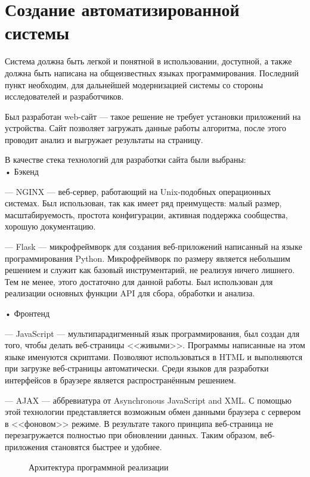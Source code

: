 \pagebreak
\section{Создание автоматизированной системы}

Система должна быть легкой и понятной в использовании, доступной, а также должна быть написана на общеизвестных языках программирования. Последний пункт необходим, для дальнейшей модернизацией системы со стороны исследователей и разработчиков.

Был разработан web-сайт --- такое решение не требует установки приложений на устройства. Сайт позволяет загружать данные работы алгоритма, после этого проводит анализ и выгружает результаты на страницу.

В качестве стека технологий для разработки сайта были выбраны:\\
• Бэкенд
\par
--- NGINX --- веб-сервер, работающий на Unix-подобных операционных системах. Был использован, так как имеет ряд преимуществ: малый размер, масштабируемость, простота конфигурации, активная поддержка сообщества, хорошую документацию.
\par
--- Flask --- микрофреймворк для создания веб-приложений написанный на языке программирования Python. Микрофреймворк по размеру является небольшим решением и служит как базовый инструментарий, не реализуя ничего лишнего. Тем не менее, этого достаточно для данной работы. Был использован для реализации основных функции API для сбора, обработки и анализа.

\noindent• Фронтенд
\par
--- JavaScript --- мультипарадигменный язык программирования, был создан для того, чтобы делать веб-страницы <<живыми>>. Программы написанные на этом языке именуются скриптами. Позволяют использоваться в HTML и выполняются при загрузке веб-страницы автоматически. Среди языков для разработки интерфейсов в браузере является распространённым решением.
\par
--- AJAX --- аббревиатура от Asynchronous JavaScript and XML. С помощью этой технологии представляется возможным обмен данными браузера с сервером в <<фоновом>> режиме. В результате такого принципа веб-страница не перезагружается полностью при обновлении данных. Таким образом, веб-приложения становятся быстрее и удобнее.

\begin{figure}[h!]
\caption{Архитектура программной реализации}
\label{ris:image1}
\end{figure}

\pagebreak